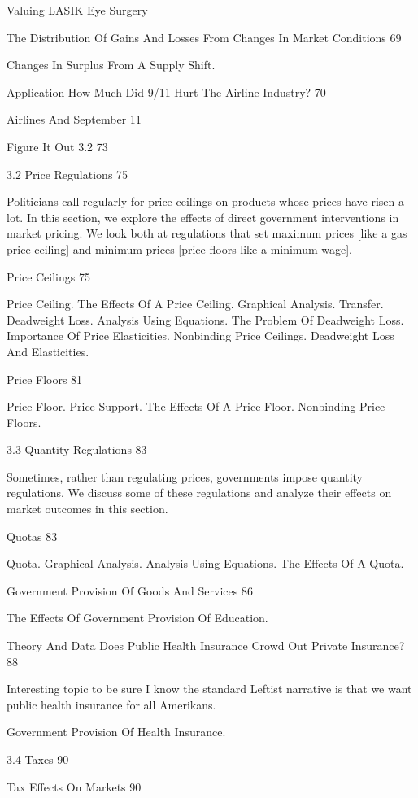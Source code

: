 Valuing LASIK Eye Surgery

The Distribution Of Gains And Losses From Changes In Market Conditions 69

Changes In Surplus From A Supply Shift.

Application How Much Did 9/11 Hurt The Airline Industry? 70

Airlines And September 11

Figure It Out 3.2 73



3.2 Price Regulations 75

Politicians call regularly for price ceilings on products whose prices have risen a lot. In this section, we explore the effects of direct government interventions in market pricing. We look both at regulations that set maximum prices [like a gas price ceiling] and minimum prices [price floors like a minimum wage].

Price Ceilings 75

Price Ceiling. The Effects Of A Price Ceiling. Graphical Analysis. Transfer. Deadweight Loss. Analysis Using Equations. The Problem Of Deadweight Loss. Importance Of Price Elasticities. Nonbinding Price Ceilings. Deadweight Loss And Elasticities.

Price Floors 81

Price Floor. Price Support. The Effects Of A Price Floor. Nonbinding Price Floors.

3.3 Quantity Regulations 83

Sometimes, rather than regulating prices, governments impose quantity regulations. We discuss some of these regulations and analyze their effects on market outcomes in this section.

Quotas 83

Quota. Graphical Analysis. Analysis Using Equations. The Effects Of A Quota.

Government Provision Of Goods And Services 86

The Effects Of Government Provision Of Education.

Theory And Data Does Public Health Insurance Crowd Out Private Insurance? 88

Interesting topic to be sure I know the standard Leftist narrative is that we want public health insurance for all Amerikans.

Government Provision Of Health Insurance.

3.4 Taxes 90



Tax Effects On Markets 90

